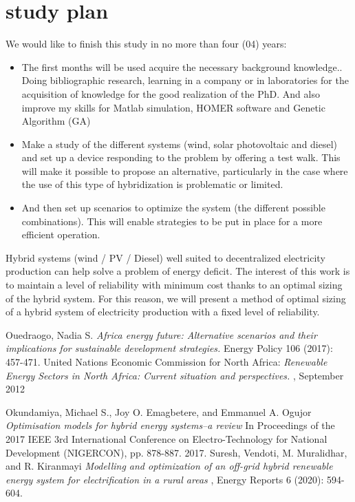 \documentclass[11.8pt,a4paper]{article}
\begin{document}
\section{study plan}
We would like to finish this study in no more than four (04) years:
\begin{itemize}
	\item The first months will be used acquire the necessary background knowledge.. Doing bibliographic research, learning in a company or in laboratories for the acquisition of knowledge for the good realization of the PhD. And also improve my skills for Matlab simulation, HOMER software and Genetic Algorithm (GA)
	\item Make a study of the different systems (wind, solar photovoltaic and diesel) and set up a device responding to the problem by offering a test walk. This will make it possible to propose an alternative, particularly in the case where the use of this type of hybridization is problematic or limited.
	\item And then set up scenarios to optimize the system (the different possible combinations). This will enable strategies to be put in place for a more efficient operation.
\end{itemize}
 Hybrid systems (wind / PV / Diesel) well suited to decentralized electricity production can help solve a problem of energy deficit. The interest of this work is to maintain a level of reliability with minimum cost thanks to an optimal sizing of the hybrid system. For this reason, we will present a method of optimal sizing of a hybrid system of electricity production with a fixed level of reliability.


























\begin{thebibliography}{99}
	 Ouedraogo, Nadia S. {\em Africa energy future: Alternative scenarios and their implications for sustainable development strategies.} Energy Policy 106 (2017): 457-471.
	 United Nations Economic Commission for North Africa: {\em Renewable Energy Sectors in North Africa: Current situation and perspectives.} , September 2012
	
	  Okundamiya, Michael S., Joy O. Emagbetere, and Emmanuel A. Ogujor {\em Optimisation models for hybrid energy systems–a review} In Proceedings of the 2017 IEEE 3rd International Conference on Electro-Technology for National Development (NIGERCON), pp. 878-887. 2017. 
	 Suresh, Vendoti, M. Muralidhar, and R. Kiranmayi {\em Modelling and optimization of an off-grid hybrid renewable energy system for electrification in a rural areas} , Energy Reports 6 (2020): 594-604.	
\end{thebibliography}
\end{document}
